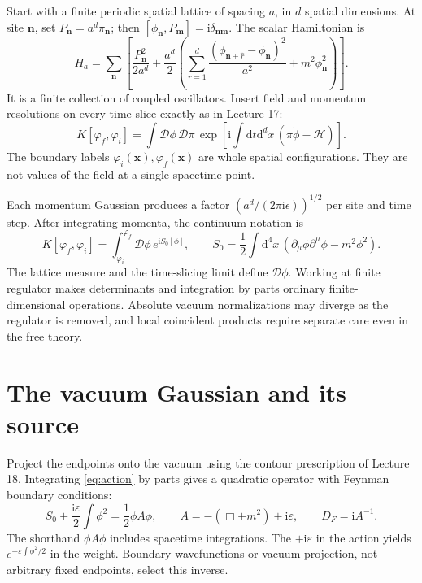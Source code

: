 \documentclass[11pt]{article}
\newcommand{\dd}{\mathrm d}
\newcommand{\ii}{\mathrm i}
\newcommand{\D}{\mathcal D}
\newcommand{\module}[1]{\clearpage\section{#1}}
\begin{document}
Start with a finite periodic spatial lattice of spacing \(a\), in
\(d\) spatial dimensions. At site \(\bm n\), set
\(P_{\bm n}=a^d\pi_{\bm n}\); then
\([\phi_{\bm n},P_{\bm m}]=\ii\delta_{\bm n\bm m}\).
The scalar Hamiltonian is
\begin{equation}
 H_a=\sum_{\bm n}\left[\frac{P_{\bm n}^2}{2a^d}
 +\frac{a^d}{2}\left(\sum_{r=1}^d
 \frac{(\phi_{\bm n+\hat r}-\phi_{\bm n})^2}{a^2}
 +m^2\phi_{\bm n}^2\right)\right].
\end{equation}
It is a finite collection of coupled oscillators. Insert field and
momentum resolutions on every time slice exactly as in Lecture 17:
\begin{equation}
 K[\varphi_f,\varphi_i]=\int\D\phi\,\D\pi\,
 \exp\!\left[\ii\int\dd t\dd^d x\,
 (\pi\dot\phi-\mathcal H)\right].
\end{equation}
The boundary labels \(\varphi_i(\bm x),\varphi_f(\bm x)\) are whole
spatial configurations. They are not values of the field at a single
spacetime point.

Each momentum Gaussian produces a factor
\((a^d/(2\pi\ii\epsilon))^{1/2}\) per site and time step. After
integrating momenta, the continuum notation is
\begin{equation}
 K[\varphi_f,\varphi_i]=\int_{\varphi_i}^{\varphi_f}\D\phi\,e^{\ii S_0[\phi]},
 \qquad S_0=\frac12\int\dd^4x\,
 (\partial_\mu\phi\partial^\mu\phi-m^2\phi^2).
                                                        \label{eq:action}
\end{equation}
The lattice measure and the time-slicing limit define \(\D\phi\).
Working at finite regulator makes determinants and integration by
parts ordinary finite-dimensional operations. Absolute vacuum
normalizations may diverge as the regulator is removed, and local
coincident products require separate care even in the free theory.

\module{The vacuum Gaussian and its source}
Project the endpoints onto the vacuum using the contour prescription
of Lecture 18. Integrating \eqref{eq:action} by parts gives a quadratic
operator with Feynman boundary conditions:
\begin{equation}
 S_0+\frac{\ii\varepsilon}{2}\int\phi^2
 =\frac12\phi A\phi,\qquad
 A=-(\Box+m^2)+\ii\varepsilon,\qquad D_F=\ii A^{-1}.
                                                        \label{eq:A}
\end{equation}
The shorthand \(\phi A\phi\) includes spacetime integrations. The
\(+\ii\varepsilon\) in the action yields
\(e^{-\varepsilon\int\phi^2/2}\) in the weight. Boundary wavefunctions
or vacuum projection, not arbitrary fixed endpoints, select this inverse.
\end{document}
